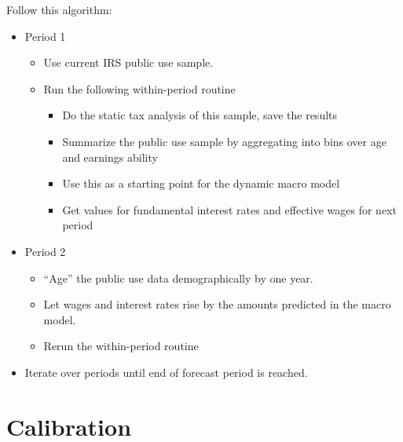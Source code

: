 \documentclass[12pt]{report}
\theoremstyle{definition}
\begin{document}
  Follow this algorithm:
  \begin{itemize}
    \item Period 1
    \begin{itemize}
      \item Use current IRS public use sample.
      \item Run the following within-period routine
      \begin{itemize}
        \item Do the static tax analysis of this sample, save the results
        \item Summarize the public use sample by aggregating into bins over age and earnings ability
        \item Use this as a starting point for the dynamic macro model
        \item Get values for fundamental interest rates and effective wages for next period
      \end{itemize}
    \end{itemize}
  \item Period 2
    \begin{itemize}
      \item “Age” the public use data demographically by one year.
      \item Let wages and interest rates rise by the amounts predicted in the macro model.
      \item Rerun the within-period routine
    \end{itemize}
  \item Iterate over periods until end of forecast period is reached.
  \end{itemize}

\section{Calibration}
\end{document}
